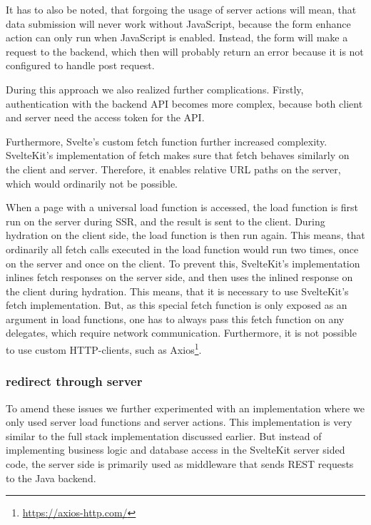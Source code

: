 It has to also be noted, that forgoing the usage of server actions will mean, that data submission will never work without JavaScript, because the form enhance action can only run when JavaScript is enabled. Instead, the form will make a request to the backend, which then will probably return an error because it is not configured to handle post request.

During this approach we also realized further complications. Firstly, authentication with the backend API becomes more complex, because both client and server need the access token for the API. 

Furthermore, Svelte's custom fetch function further increased complexity. SvelteKit's implementation of fetch makes sure that fetch behaves similarly on the client and server. Therefore, it enables relative URL paths on the server, which would ordinarily not be possible.

When a page with a universal load function is accessed, the load function is first run on the server during SSR, and the result is sent to the client. During hydration on the client side, the load function is then run again. This means, that ordinarily all fetch calls executed in the load function would run two times, once on the server and once on the client. To prevent this, SvelteKit's implementation inlines fetch responses on the server side, and then uses the inlined response on the client during hydration. This means, that it is necessary to use SvelteKit's fetch implementation. But, as this special fetch function is only exposed as an argument in load functions, one has to always pass this fetch function on any delegates, which require network communication. Furthermore, it is not possible to use custom HTTP-clients, such as Axios\footnote{\url{https://axios-http.com/}}.  

\subsubsection{redirect through server}

To amend these issues we further experimented with an implementation where we only used server load functions and server actions. This implementation is very similar to the full stack implementation discussed earlier. But instead of implementing business logic and database access in the SvelteKit server sided code, the server side is primarily used as middleware that sends REST requests to the Java backend.

